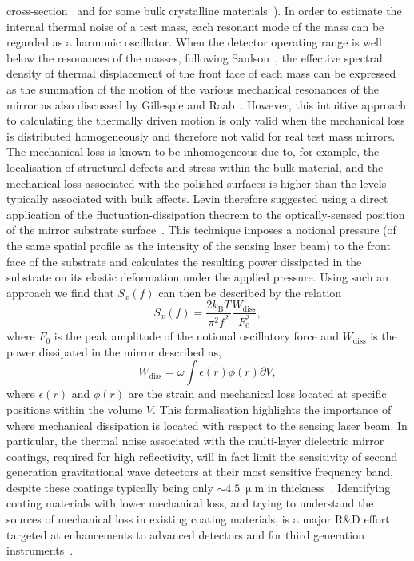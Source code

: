 \documentclass{article}
\begin{document}
cross-section~\cite{Nowick} and for some bulk crystalline
materials~\cite{Bragthermo}). In order to estimate the internal thermal noise of
a test mass, each resonant mode of the mass can be regarded as a harmonic
oscillator. When the detector operating range is well below the resonances of
the masses, following Saulson~\cite{Saulson2}, the effective spectral density of
thermal displacement of the front face of each mass can be expressed as the
summation of the motion of the various mechanical resonances of the mirror as
also discussed by Gillespie and Raab~\cite{Gillespie}. However, this intuitive
approach to calculating the thermally driven motion is only valid when the
mechanical loss is distributed homogeneously and therefore not valid for real
test mass mirrors. The mechanical loss is known to be inhomogeneous due to, for
example, the localisation of structural defects and stress within the bulk
material, and the mechanical loss associated with the polished surfaces is
higher than the levels typically associated with bulk effects.  Levin therefore
suggested using a direct application of the fluctuation-dissipation theorem to
the optically-sensed position of the mirror substrate surface~\cite{Levin}.
This technique imposes a notional pressure (of the same spatial profile as the
intensity of the sensing laser beam) to the front face of the substrate and
calculates the resulting power dissipated in the substrate on its elastic
deformation under the applied pressure.  Using such an approach we find that
$S_x(f)$ can then be described by the relation
\begin{equation}
 S_x(f) = \frac{2k_\mathrm{B}T}{\pi^2 f^2} \frac{W_\mathrm{{diss}}}{F_0^2},
 \label{eqn:S-x_Levin}
\end{equation}
where $F_0$ is the peak amplitude of the notional oscillatory force and
$W_\mathrm{{diss}}$ is the power dissipated in the mirror described as,
\begin{equation}
 W_\mathrm{{diss}} = \omega \int{\epsilon(r)\phi(r)\partial V},
 \label{eqn:S-x_Levin2}
\end{equation}
where $\epsilon(r)$ and $\phi(r)$ are the strain and mechanical loss located at
specific positions within the volume $V$. This formalisation highlights the
importance of where mechanical dissipation is located with respect to the
sensing laser beam.  In particular, the thermal noise associated with the
multi-layer dielectric mirror coatings, required for high reflectivity, will in
fact limit the sensitivity of second generation gravitational wave detectors at
their most sensitive frequency band, despite these coatings typically being only
$\sim 4.5~\upmu \textrm{m}$ in thickness~\cite{Harry:2002}. Identifying coating
materials with lower mechanical loss, and trying to understand the sources of
mechanical loss in existing coating materials, is a major R\&D  effort targeted
at enhancements to advanced detectors and for third generation
instruments~\cite{Martin:2008}.
\end{document}
